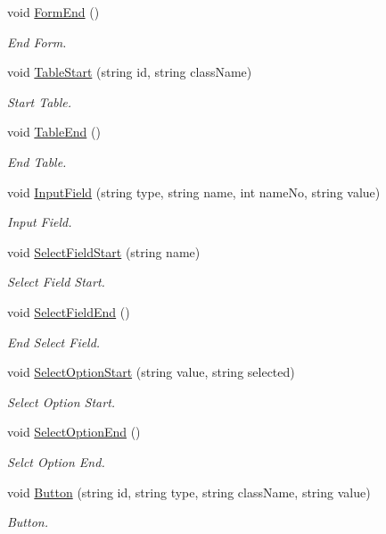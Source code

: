 \begin{DoxyCompactItemize}
void \hyperlink{classHTMLTags_ab57baef28db9590ce59d0e2f403a210f}{Form\-End} ()
\begin{DoxyCompactList}\small\item\em End Form. \end{DoxyCompactList}\item 
void \hyperlink{classHTMLTags_a9d4bc37c7d615bc1d7f7c738dae48ad3}{Table\-Start} (string id, string class\-Name)
\begin{DoxyCompactList}\small\item\em Start Table. \end{DoxyCompactList}\item 
void \hyperlink{classHTMLTags_a0655d9f70a8c1a61c406280d8fb9df7a}{Table\-End} ()
\begin{DoxyCompactList}\small\item\em End Table. \end{DoxyCompactList}\item 
void \hyperlink{classHTMLTags_a705aef36f0847c2a5f10a5df8e079ce8}{Input\-Field} (string type, string name, int name\-No, string value)
\begin{DoxyCompactList}\small\item\em Input Field. \end{DoxyCompactList}\item 
void \hyperlink{classHTMLTags_adb6e7ef0a1320dbf6d4acbe1ea3e418f}{Select\-Field\-Start} (string name)
\begin{DoxyCompactList}\small\item\em Select Field Start. \end{DoxyCompactList}\item 
void \hyperlink{classHTMLTags_adde967a90e03f4b5168b9bffd319980b}{Select\-Field\-End} ()
\begin{DoxyCompactList}\small\item\em End Select Field. \end{DoxyCompactList}\item 
void \hyperlink{classHTMLTags_a372570979ccc675e0ed752fe272e3cd6}{Select\-Option\-Start} (string value, string selected)
\begin{DoxyCompactList}\small\item\em Select Option Start. \end{DoxyCompactList}\item 
void \hyperlink{classHTMLTags_ae312980d20e3dea0469fdcb730fb975e}{Select\-Option\-End} ()
\begin{DoxyCompactList}\small\item\em Selct Option End. \end{DoxyCompactList}\item 
void \hyperlink{classHTMLTags_ab6dbb027d808e7b708a4ece7e911ceee}{Button} (string id, string type, string class\-Name, string value)
\begin{DoxyCompactList}\small\item\em Button. \end{DoxyCompactList}\end{DoxyCompactItemize}
